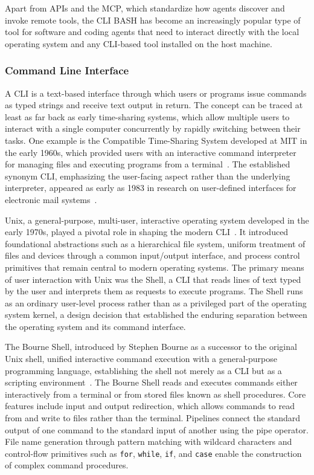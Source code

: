 \documentclass[
english,                 %
bibtex,                  %
includeExtraAbstracts, %
]{kththesis}
\numberwithin{listing}{chapter}
\begin{document}
Apart from \glspl{API} and the \gls{MCP}, which standardize how agents discover and invoke remote tools, the \gls{CLI} \gls{BASH} has become an increasingly popular type of tool for software and coding agents that need to interact directly with the local operating system and any \gls{CLI}-based tool installed on the host machine.

\subsubsection{Command Line Interface}

A \gls{CLI} is a text-based interface through which users or programs issue commands as typed strings and receive text output in return. The concept can be traced at least as far back as early time-sharing systems, which allow multiple users to interact with a single computer concurrently by rapidly switching between their tasks. One example is the Compatible Time-Sharing System developed at \gls{MIT} in the early 1960s, which provided users with an interactive command interpreter for managing files and executing programs from a terminal~\cite{corbato_experimental_1962}. The established synonym \gls{CLI}, emphasizing the user-facing aspect rather than the underlying interpreter, appeared as early as 1983 in research on user-defined interfaces for electronic mail systems~\cite{wixon_building_1983}.

Unix, a general-purpose, multi-user, interactive operating system developed in the early 1970s, played a pivotal role in shaping the modern \gls{CLI}~\cite{ritchie_unix_1974}. It introduced foundational abstractions such as a hierarchical file system, uniform treatment of files and devices through a common input/output interface, and process control primitives that remain central to modern operating systems. The primary means of user interaction with Unix was the Shell, a \gls{CLI} that reads lines of text typed by the user and interprets them as requests to execute programs. The Shell runs as an ordinary user-level process rather than as a privileged part of the operating system kernel, a design decision that established the enduring separation between the operating system and its command interface.

The Bourne Shell, introduced by Stephen Bourne as a successor to the original Unix shell, unified interactive command execution with a general-purpose programming language, establishing the shell not merely as a \gls{CLI} but as a scripting environment~\cite{bourne_introduction_1997}. The Bourne Shell reads and executes commands either interactively from a terminal or from stored files known as shell procedures. Core features include input and output redirection, which allows commands to read from and write to files rather than the terminal. Pipelines connect the standard output of one command to the standard input of another using the pipe operator. File name generation through pattern matching with wildcard characters and control-flow primitives such as \texttt{for}, \texttt{while}, \texttt{if}, and \texttt{case} enable the construction of complex command procedures.
\end{document}

